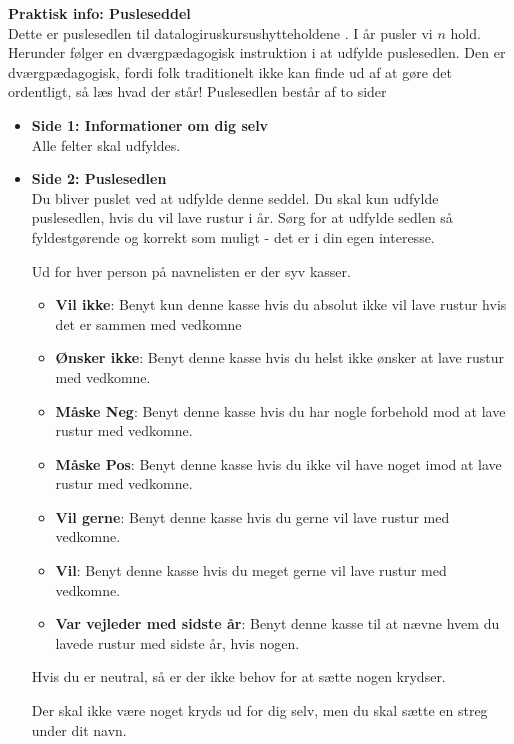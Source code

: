 \documentclass[10pt,a4paper,letterpaper]{article}
\begin{document}
\thispagestyle{empty}
{\large{\textbf{Praktisk info: Pusleseddel \the\year}}}\\
Dette er puslesedlen til datalogiruskursushytteholdene \the\year. I år pusler vi $n$
hold. Herunder følger en dværgpædagogisk instruktion i at udfylde puslesedlen.
Den er dværgpædagogisk, fordi folk traditionelt ikke kan finde ud af at gøre det
ordentligt, så læs hvad der står!
Puslesedlen består af to sider

\begin{itemize}
  \item \textbf{Side 1: Informationer om dig selv} \\
    Alle felter skal udfyldes.
  \item \textbf{Side 2: Puslesedlen} \\
Du bliver puslet ved at udfylde denne seddel. Du skal kun udfylde puslesedlen,
hvis du vil lave rustur i år. Sørg for at udfylde sedlen så fyldestgørende og
korrekt som muligt - det er i din egen interesse.

Ud for hver person på navnelisten er der syv kasser.
\begin{itemize}
  \item \textbf{Vil ikke}: Benyt kun denne kasse hvis du absolut ikke vil lave rustur hvis det er sammen med vedkomne
  \item \textbf{Ønsker ikke}: Benyt denne kasse hvis du helst ikke ønsker at lave rustur med vedkomne.
  \item \textbf{Måske Neg}: Benyt denne kasse hvis du har nogle forbehold mod at lave rustur med vedkomne.
  \item \textbf{Måske Pos}: Benyt denne kasse hvis du ikke vil have noget imod at lave rustur med vedkomne.
  \item \textbf{Vil gerne}: Benyt denne kasse hvis du gerne vil lave rustur med vedkomne.
  \item \textbf{Vil}: Benyt denne kasse hvis du meget gerne vil lave rustur med vedkomne.
  \item \textbf{Var vejleder med sidste år}: Benyt denne kasse til at nævne hvem du
    lavede rustur med sidste år, hvis nogen.
\end{itemize}
Hvis du er neutral, så er der ikke behov for at sætte nogen krydser.

Der skal ikke være noget kryds ud for dig selv, men du skal sætte en streg under
dit navn.\\
\end{itemize}
\end{document}
